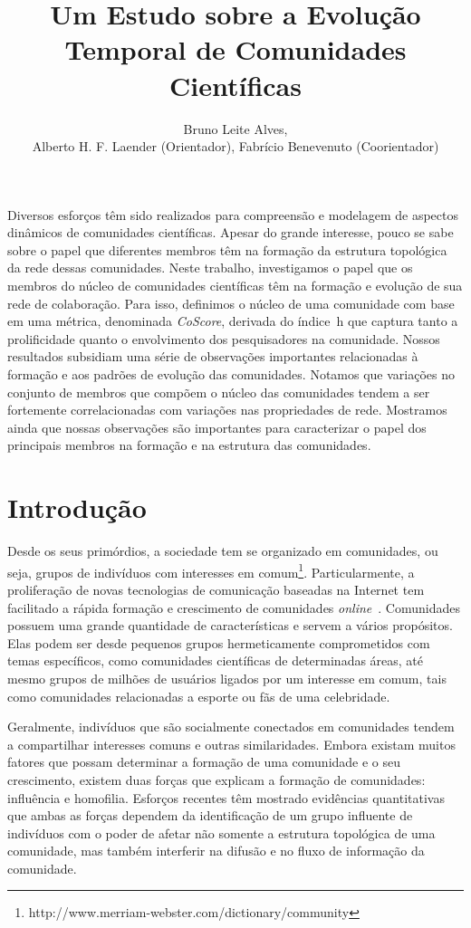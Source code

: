 \documentclass[12pt]{article}
\title{Um Estudo sobre a Evolução Temporal de Comunidades Científicas}
\author{Bruno Leite Alves, \\ Alberto H. F. Laender (Orientador),  
	  Fabrício Benevenuto (Coorientador) }
\begin{document}
 

\maketitle

\begin{resumo} 
Diversos esforços têm sido realizados para compreensão e modelagem de
aspectos dinâmicos de comunidades científicas. Apesar do grande interesse, pouco se sabe
sobre o papel que diferentes membros têm na formação da estrutura topológica da rede 
dessas comunidades. Neste trabalho, investigamos o papel 
que os membros do núcleo de comunidades científicas têm na formação e evolução de sua rede de 
colaboração. Para isso, definimos o núcleo de uma comunidade com base em uma 
métrica, denominada \textit{CoScore}, derivada do índice~h que captura 
tanto a prolificidade quanto o envolvimento dos pesquisadores na comunidade. 
Nossos resultados subsidiam uma série de observações importantes relacionadas à 
formação e aos padrões de evolução das comunidades. Notamos que variações no conjunto de membros que compõem o núcleo das comunidades tendem a ser fortemente 
correlacionadas com variações nas propriedades de rede. 
Mostramos ainda que nossas observações 
são importantes para caracterizar o papel dos principais membros na formação e na estrutura das comunidades.
\end{resumo}


\section{Introdução}

Desde os seus primórdios, a sociedade tem se organizado em comunidades, ou seja, grupos de indivíduos 
com interesses em comum\footnote{http://www.merriam-webster.com/dictionary/community}. Particularmente, 
a proliferação de novas tecnologias de comunicação baseadas na Internet tem facilitado a rápida 
formação e crescimento de comunidades \textit{online}~\cite{Kleinberg2008}. Comunidades possuem uma grande 
quantidade de características e servem a vários propósitos. Elas podem ser desde pequenos 
grupos hermeticamente comprometidos com temas específicos, como comunidades científicas de determinadas áreas, 
até mesmo grupos de milhões de usuários ligados por um interesse em comum, tais como comunidades 
relacionadas a esporte ou fãs de uma celebridade.

Geralmente, indivíduos que são socialmente conectados em comunidades tendem a compartilhar interesses comuns
e outras similaridades. Embora existam muitos fatores que possam determinar a formação de uma comunidade
e o seu crescimento, existem duas forças que explicam a formação de comunidades: influência 
e homofilia. Esforços recentes 
têm mostrado evidências quantitativas que ambas as forças
dependem da identificação de um grupo influente 
de indivíduos com o poder de afetar não somente a estrutura topológica de uma comunidade, 
mas também interferir na difusão e no fluxo de informação da comunidade.
\end{document}
